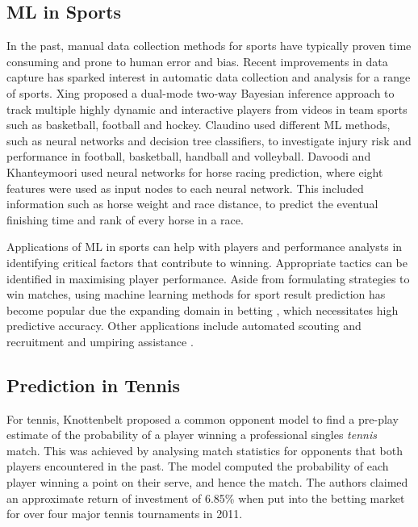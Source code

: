 \subsection{ML in Sports}

In the past, manual data collection methods for sports have typically proven time consuming and prone to human error and bias. Recent improvements in data capture has sparked interest in automatic data collection and analysis for a range of sports. Xing \etal \cite{xing2010multiple} proposed a dual-mode two-way Bayesian inference approach to track multiple highly dynamic and interactive players from videos in team sports such as basketball, football and hockey. Claudino \etal \cite{claudino2019current} used different ML methods, such as neural networks and decision tree classifiers, to investigate injury risk and performance in football, basketball, handball and volleyball. Davoodi and Khanteymoori \cite{davoodi2010horse} used neural networks for horse racing prediction, where eight features were used as input nodes to each neural network. This included information such as horse weight and race distance, to predict the eventual finishing time and rank of every horse in a race. 




Applications of ML in sports can help with players and performance analysts in identifying critical factors that contribute to winning. Appropriate tactics can be identified in maximising player performance.
Aside from formulating strategies to win matches, using machine learning methods for sport result prediction has become popular due the expanding domain in betting \todo{[cit.]}, which necessitates high predictive accuracy. Other applications include automated scouting and recruitment \cite{bunker2019machine} and umpiring assistance \cite{vzemgulys2018recognition}. 


\subsection{Prediction in Tennis}
For tennis, Knottenbelt \etal \cite{knottenbelt2012common} proposed a common opponent model to find a pre-play estimate of the probability of a player winning a professional singles \textit{tennis} match. This was achieved by analysing match statistics for opponents that both players encountered in the past.%
The model computed the probability of each player winning a point on their serve, and hence the match. The authors claimed an approximate return of investment of 6.85\% when put into the betting market for over four major tennis tournaments in 2011.  

